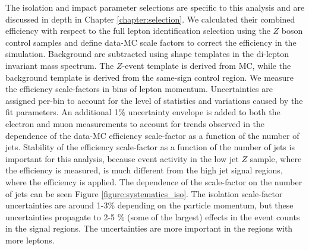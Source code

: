 The isolation and impact parameter selections are specific to this analysis and are discussed in depth in Chapter \ref{chapter:selection}. We calculated their combined efficiency with respect to the full lepton identification selection using the $Z$ boson control samples and define data-MC scale factors to correct the efficiency in the simulation. Background are subtracted using shape templates in the di-lepton invariant mass spectrum. The $Z$-event template is derived from MC, while the background template is derived from the same-sign control region. We measure the efficiency scale-factors in bins of lepton momentum. Uncertainties are assigned per-bin to account for the level of statistics and variations caused by the fit parameters. An additional 1\% uncertainty envelope is added to both the electron and muon measurements to account for trends observed in the dependence of the data-MC efficiency scale-factor as a function of the number of jets. Stability of the efficiency scale-factor as a function of the number of jets is important for this analysis, because event activity in the low jet $Z$ sample, where the efficiency is measured, is much different from the high jet signal regions, where the efficiency is applied. The dependence of the scale-factor on the number of jets can be seen Figure \ref{figure:systematics_iso}. The isolation scale-factor uncertainties are around 1-3\% depending on the particle momentum, but these uncertainties propagate to 2-5 \% (some of the largest) effects in the event counts in the signal regions. The uncertainties are more important in the regions with more leptons. 


